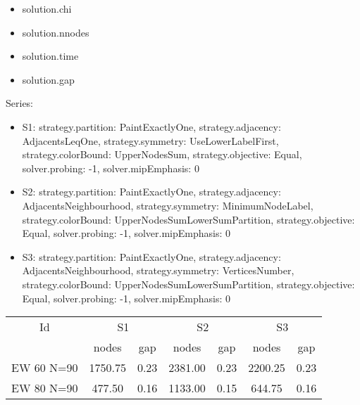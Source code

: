 \begin{itemize}
\item solution.chi
\item solution.nnodes
\item solution.time
\item solution.gap
\end{itemize}
Series:
\begin{itemize}
\item S1: strategy.partition: PaintExactlyOne, strategy.adjacency: AdjacentsLeqOne, strategy.symmetry: UseLowerLabelFirst, strategy.colorBound: UpperNodesSum, strategy.objective: Equal, solver.probing: -1, solver.mipEmphasis: 0
\item S2: strategy.partition: PaintExactlyOne, strategy.adjacency: AdjacentsNeighbourhood, strategy.symmetry: MinimumNodeLabel, strategy.colorBound: UpperNodesSumLowerSumPartition, strategy.objective: Equal, solver.probing: -1, solver.mipEmphasis: 0
\item S3: strategy.partition: PaintExactlyOne, strategy.adjacency: AdjacentsNeighbourhood, strategy.symmetry: VerticesNumber, strategy.colorBound: UpperNodesSumLowerSumPartition, strategy.objective: Equal, solver.probing: -1, solver.mipEmphasis: 0
\end{itemize}
\begin{tabular}{|c|cc|cc|cc|}
\hline
\multicolumn{1}{|c|}{Id} & \multicolumn{2}{|c|}{S1} & \multicolumn{2}{|c|}{S2} & \multicolumn{2}{|c|}{S3}
\\
 & nodes & gap & nodes & gap & nodes & gap
\\
\hline
EW 60 N=90 & 1750.75& 0.23 & 2381.00 & 0.23 & 2200.25 & 0.23
\\
EW 80 N=90 & 477.50 & 0.16 & 1133.00& 0.15 & 644.75 &0.16
\\
\hline 
 \end{tabular}